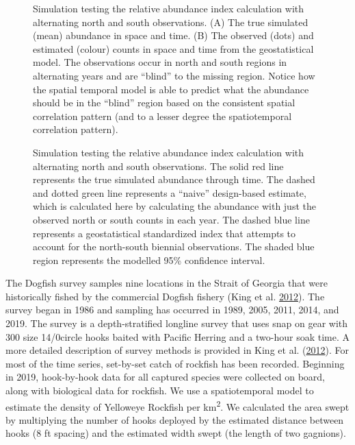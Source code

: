 \documentclass[11pt]{book}
\begin{document}
\begin{figure}[htb]

{\centering {} 

}

\caption{Simulation testing the relative abundance index calculation with alternating north and south observations. (A) The true simulated (mean) abundance in space and time. (B) The observed (dots) and estimated (colour) counts in space and time from the geostatistical model. The observations occur in north and south regions in alternating years and are ``blind'' to the missing region. Notice how the spatial temporal model is able to predict what the abundance should be in the ``blind'' region based on the consistent spatial correlation pattern (and to a lesser degree the spatiotemporal correlation pattern).}\label{fig:stich-sim-pred}
\end{figure}
\clearpage
\begin{figure}[htb]

{\centering {} 

}

\caption{Simulation testing the relative abundance index calculation with alternating north and south observations. The solid red line represents the true simulated abundance through time. The dashed and dotted green line represents a ``naive'' design-based estimate, which is calculated here by calculating the abundance with just the observed north or south counts in each year. The dashed blue line represents a geostatistical standardized index that attempts to account for the north-south biennial observations. The shaded blue region represents the modelled 95\% confidence interval.}\label{fig:stich-sim-index}
\end{figure}
\clearpage

\hypertarget{sec:dogfish-index-data}{%
\label{sec:dogfish-index-data}}

The Dogfish survey samples nine locations in the Strait of Georgia that were historically fished by the commercial Dogfish fishery (King et al. \protect\hyperlink{ref-king2012}{2012}). The survey began in 1986 and sampling has occurred in 1989, 2005, 2011, 2014, and 2019. The survey is a depth-stratified longline survey that uses snap on gear with 300 size 14/0circle hooks baited with Pacific Herring and a two-hour soak time. A more detailed description of survey methods is provided in King et al. (\protect\hyperlink{ref-king2012}{2012}). For most of the time series, set-by-set catch of rockfish has been recorded. Beginning in 2019, hook-by-hook data for all captured species were collected on board, along with biological data for rockfish. We use a spatiotemporal model to estimate the density of Yelloweye Rockfish per km\textsuperscript{2}. We calculated the area swept by multiplying the number of hooks deployed by the estimated distance between hooks (8 ft spacing) and the estimated width swept (the length of two gagnions).
\end{document}
